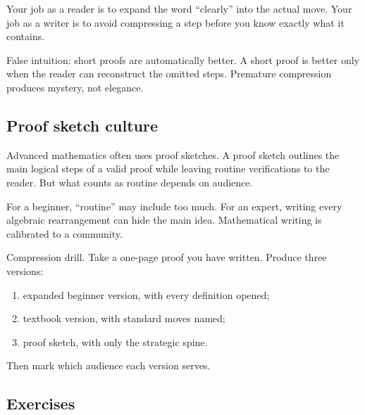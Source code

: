 Your job as a reader is to expand the word ``clearly'' into the actual move. Your job as a writer is to avoid compressing a step before you know exactly what it contains.

\begin{trapbox}
False intuition: short proofs are automatically better. A short proof is better only when the reader can reconstruct the omitted steps. Premature compression produces mystery, not elegance.
\end{trapbox}

\subsection{Proof sketch culture}

Advanced mathematics often uses proof sketches. A proof sketch outlines the main logical steps of a valid proof while leaving routine verifications to the reader. But what counts as routine depends on audience.

For a beginner, ``routine'' may include too much. For an expert, writing every algebraic rearrangement can hide the main idea. Mathematical writing is calibrated to a community.

\begin{labbox}
Compression drill. Take a one-page proof you have written. Produce three versions:
\begin{enumerate}
\item expanded beginner version, with every definition opened;
\item textbook version, with standard moves named;
\item proof sketch, with only the strategic spine.
\end{enumerate}
Then mark which audience each version serves.
\end{labbox}

\subsection{Exercises}

